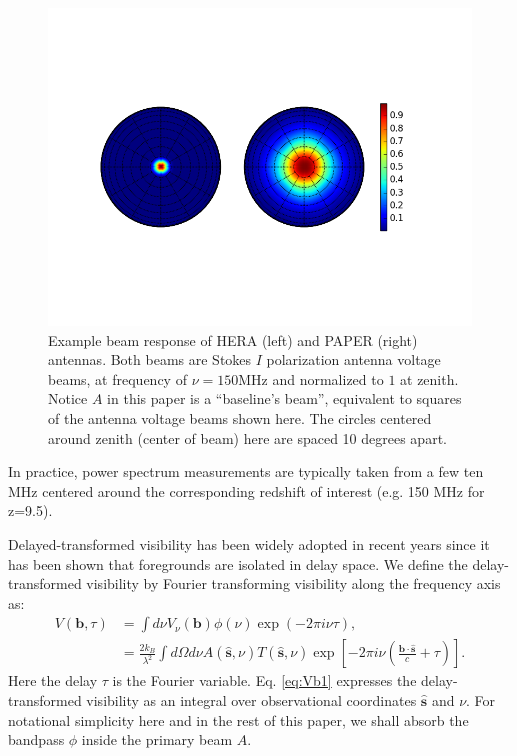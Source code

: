 \documentclass[twocolumn,apj,numberedappendix]{emulateapj}
\renewcommand\[{\begin{equation}}
\renewcommand\]{\end{equation}}
\begin{document}
\begin{figure}[H]
\includegraphics[width=1.2\linewidth]{Beams}

\caption{Example beam response of HERA (left) and PAPER (right) antennas. Both beams are Stokes $I$ polarization antenna voltage beams, at frequency of $\nu=150\text{MHz}$ and normalized to $1$ at zenith. Notice $A$ in this paper is a ``baseline's beam'', equivalent to squares of the antenna voltage beams shown here. The circles centered around zenith (center of beam) here are
spaced 10 degrees apart. \label{fig:Beam}}
\end{figure}

In practice,
power spectrum measurements are typically taken from a few ten MHz centered around the corresponding redshift of interest (e.g. 150 MHz for z=9.5). 

Delayed-transformed visibility has been widely adopted in recent years since it has been shown that foregrounds are isolated in delay space. We define the delay-transformed visibility by Fourier transforming visibility along the frequency axis\citep{delay-transform} as:
\small
\begin{equation}
\begin{aligned}V(\boldsymbol{b},\tau) & =\int d\nu V_{\nu}(\boldsymbol{b})\phi(\nu)\exp\left(-2\pi i\nu\tau\right),\\
 & =\frac{2k_{B}}{\lambda^{2}}\int d\Omega d\nu A(\hat{\boldsymbol{s}},\nu)T(\hat{\boldsymbol{s}},\nu)\exp\left[-2\pi i\nu\left(\frac{\boldsymbol{b}\cdot\hat{\boldsymbol{s}}}{c}+\tau\right)\right]. 
\end{aligned}
\label{eq:Vb1}
\end{equation}
\normalsize
Here the delay $\tau$ is the Fourier variable. Eq. \eqref{eq:Vb1} expresses the delay-transformed visibility as
an integral over observational coordinates $\hat{\boldsymbol{s}}$ and $\nu$. For notational simplicity here and in the rest of this paper, we shall absorb the bandpass $\phi$ inside the primary beam $A$.  
\end{document}
